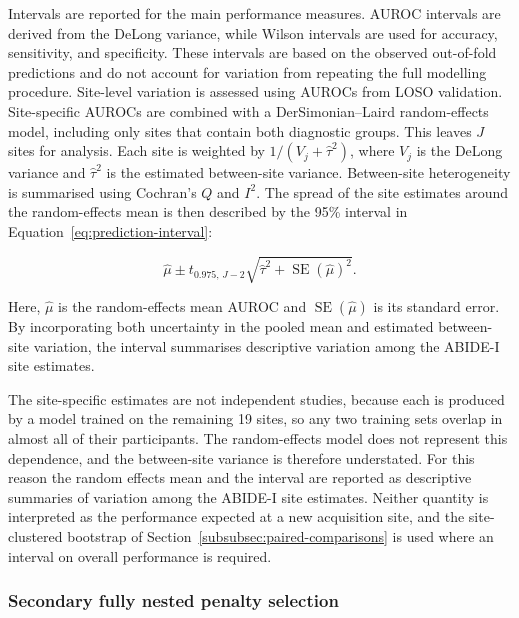 Intervals are reported for the main performance measures. AUROC intervals are derived from the DeLong variance, while Wilson intervals are used for accuracy, sensitivity, and specificity. These intervals are based on the observed out-of-fold predictions and do not account for variation from repeating the full modelling procedure. Site-level variation is assessed using AUROCs from LOSO validation. Site-specific AUROCs are combined with a DerSimonian--Laird random-effects model, including only sites that contain both diagnostic groups. This leaves $J$ sites for analysis. Each site is weighted by $1/(V_j+\hat{\tau}^2)$, where $V_j$ is the DeLong variance and $\hat{\tau}^2$ is the estimated between-site variance. Between-site heterogeneity is summarised using Cochran's $Q$ and $I^2$. The spread of the site estimates around the random-effects mean is then described by the 95\% interval in Equation~\eqref{eq:prediction-interval}:

\begin{equation}
\hat{\mu}
\pm
t_{0.975,\,J-2}
\sqrt{\hat{\tau}^2+\operatorname{SE}(\hat{\mu})^2}.
\label{eq:prediction-interval}
\end{equation}

Here, $\hat{\mu}$ is the random-effects mean AUROC and
$\operatorname{SE}(\hat{\mu})$ is its standard error. By incorporating both uncertainty in
the pooled mean and estimated between-site variation, the interval summarises descriptive variation among the ABIDE-I site estimates.

The site-specific estimates are not independent studies, because each is produced by a model
trained on the remaining 19 sites, so any two training sets overlap in almost all of their
participants. The random-effects model does not represent this dependence, and the
between-site variance is therefore understated. For this reason the random effects mean and
the interval are reported as descriptive summaries of variation among the ABIDE-I site
estimates. Neither quantity is interpreted as the performance expected at a new acquisition
site, and the site-clustered bootstrap of Section~\ref{subsubsec:paired-comparisons} is used
where an interval on overall performance is required.



\subsubsection{Secondary fully nested penalty selection}
\label{subsubsec:nested-penalty}

